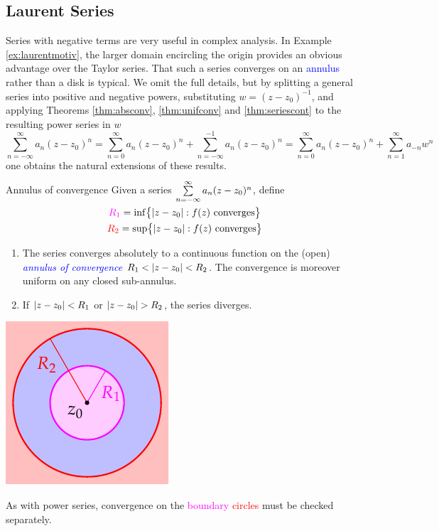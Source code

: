 \subsection{Laurent Series}\label{sec:laurent}

Series with negative terms are very useful in complex analysis. In Example \ref{ex:laurentmotiv}, the larger domain encircling the origin provides an obvious advantage over the Taylor series. That such a series converges on an \textcolor{blue}{annulus} rather than a disk is typical. We omit the full details, but by splitting a general series into positive and negative powers, substituting $w=(z-z_0)^{-1}$, and applying Theorems \ref{thm:absconv}, \ref{thm:unifconv} and \ref{thm:seriescont} to the resulting power series in $w$
\[
	\sum\limits_{n=-\infty}^{\infty} a_n(z-z_0)^n=\sum\limits_{n=0}^{\infty} a_n(z-z_0)^n+\sum\limits_{n=-\infty}^{-1} a_n(z-z_0)^n
	=\sum\limits_{n=0}^{\infty} a_n(z-z_0)^n +\sum\limits_{n=1}^\infty a_{-n}w^n
\]
one obtains the natural extensions of these results.

\begin{thm}{Annulus of convergence}{}
	Given a series $\smash[b]{\sum\limits_{n=-\infty}^{\smash{\infty}} a_n(z-z_0)^n}$, define\par
	\begin{minipage}[t]{0.7\linewidth}\vspace{-14pt}
		\begin{gather*}
			\textcolor{Magenta}{R_1}=\inf\bigl\{\nm{z-z_0}:f(z)\text{ converges}\bigr\}\\
			\textcolor{red}{R_2}=\sup\bigl\{\nm{z-z_0}:f(z)\text{ converges}\bigr\}
		\end{gather*}
		\begin{enumerate}
		  \item The series converges absolutely to a continuous function on the (open) \emph{\textcolor{blue}{annulus of convergence}} $R_1<\left| z-z_0\right|<R_2$. The convergence is moreover uniform on any closed sub-annulus.
		  \item If \textcolor{Magenta}{$\left| z-z_0\right|<R_1$} or \textcolor{red}{$\nm{z-z_0}>R_2$}, the series diverges.
		\end{enumerate}
	\end{minipage}
	\hfill
	\begin{minipage}[t]{0.29\linewidth}\vspace{0pt}
		\hfill\includegraphics[scale=0.95]{laurent8}
	\end{minipage}\medbreak
	As with power series, convergence on the \textcolor{Magenta}{boundary} \textcolor{red}{circles} must be checked separately.
\end{thm}

